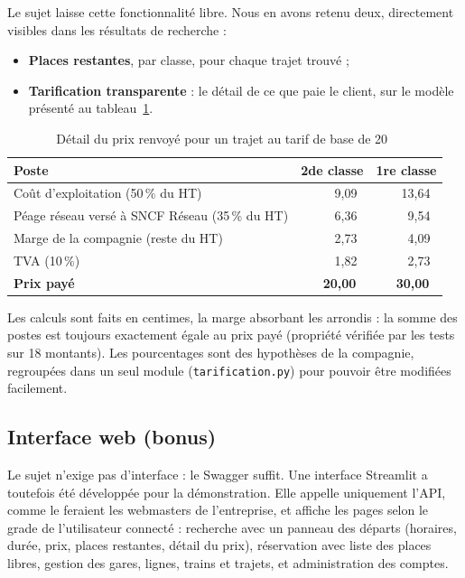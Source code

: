 \documentclass[11pt,a4paper]{article}
\newcommand{\code}[1]{\texttt{#1}}
\begin{document}
Le sujet laisse cette fonctionnalité libre. Nous en avons retenu deux, directement visibles dans
les résultats de recherche :
\begin{itemize}[nosep]
  \item \textbf{Places restantes}, par classe, pour chaque trajet trouvé ;
  \item \textbf{Tarification transparente} : le détail de ce que paie le client, sur le modèle
        présenté au tableau~\ref{tab:prix}.
\end{itemize}

\begin{table}[H]
\centering\small
\begin{tabular}{@{}l r r@{}}
\toprule
\textbf{Poste} & \textbf{2de classe} & \textbf{1re classe} \\
\midrule
Coût d'exploitation (50\,\% du HT)      &  9,09~\texteuro{} & 13,64~\texteuro{} \\
Péage réseau versé à SNCF Réseau (35\,\% du HT) &  6,36~\texteuro{} &  9,54~\texteuro{} \\
Marge de la compagnie (reste du HT)     &  2,73~\texteuro{} &  4,09~\texteuro{} \\
TVA (10\,\%)                            &  1,82~\texteuro{} &  2,73~\texteuro{} \\
\midrule
\textbf{Prix payé}                      & \textbf{20,00~\texteuro{}} & \textbf{30,00~\texteuro{}} \\
\bottomrule
\end{tabular}
\caption{Détail du prix renvoyé pour un trajet au tarif de base de 20~\texteuro{}}\label{tab:prix}
\end{table}

Les calculs sont faits en centimes, la marge absorbant les arrondis : la somme des postes est
toujours exactement égale au prix payé (propriété vérifiée par les tests sur 18 montants). Les
pourcentages sont des hypothèses de la compagnie, regroupées dans un seul module
(\code{tarification.py}) pour pouvoir être modifiées facilement.

\subsection{Interface web (bonus)}

Le sujet n'exige pas d'interface : le Swagger suffit. Une interface Streamlit a toutefois été
développée pour la démonstration. Elle appelle uniquement l'API, comme le feraient les webmasters
de l'entreprise, et affiche les pages selon le grade de l'utilisateur connecté : recherche avec un
panneau des départs (horaires, durée, prix, places restantes, détail du prix), réservation avec
liste des places libres, gestion des gares, lignes, trains et trajets, et administration des
comptes.
\end{document}
